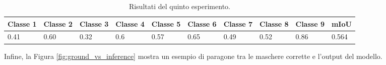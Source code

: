 \begin{table}[h!]
\hspace{-0.1in}
\begin{tabular}{||p{1cm} p{1cm} p{1cm} p{1cm} p{1cm} p{1cm} p{1cm} p{1cm} p{1cm} | p{1cm}||}
 \hline
    Classe 1 & Classe 2 & Classe 3 & Classe 4 & Classe 5 & Classe 6 & Classe 7 & Classe 8 & Classe 9 & mIoU \\ [0.5ex]
 \hline
0.41 & 0.60 & 0.32 & 0.6 &  0.57 & 0.65 & 0.49 & 0.52 & 0.86 & 0.564 \\ [1ex] 
 \hline
\end{tabular}
\caption{Risultati del quinto esperimento.}
\label{table:config9_mIoU_2}
\end{table}


Infine, la Figura \ref{fig:ground_vs_inference} mostra un esempio di paragone tra le maschere corrette e l'output del modello.


